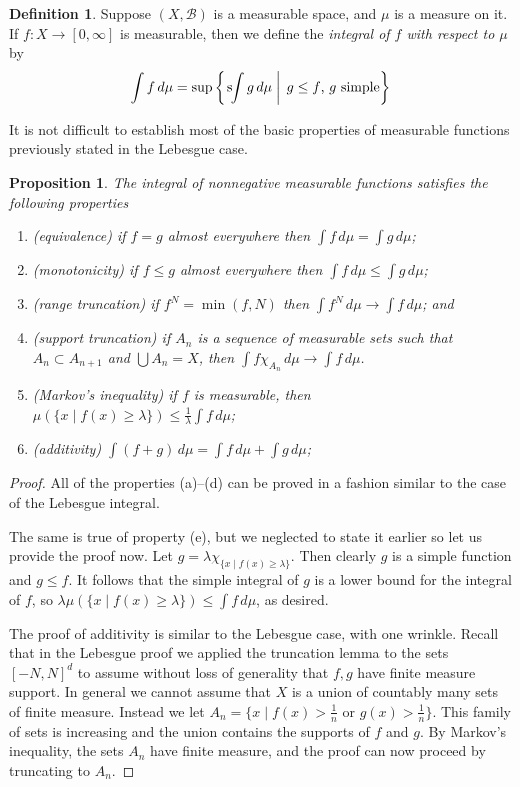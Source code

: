 \documentclass[11pt,oneside]{amsbook}
\newcommand{\sint}{\text{s}\kern-3pt\int}
\theoremstyle{definition}
\theoremstyle{plain}
\newtheorem{prop}[thm]{Proposition}
\theoremstyle{definition}
\newtheorem{defn}[thm]{Definition}
\theoremstyle{remark}
\numberwithin{equation}{section}
\numberwithin{figure}{section}
\begin{document}
\begin{defn}
  Suppose $(X,\mathcal B)$ is a measurable space, and $\mu$ is a measure on it. If $f\colon X\to[0,\infty]$ is measurable, then we define the \emph{integral of $f$ with respect to $\mu$} by
  \[\int f\,d\mu=\sup\left\{\left.\sint g\,d\mu\;\right|\;g\leq f\text{, $g$ simple}\right\}
  \]
\end{defn}

It is not difficult to establish most of the basic properties of measurable functions previously stated in the Lebesgue case.

\begin{prop}
  The integral of nonnegative measurable functions satisfies the following properties
  \begin{enumerate}
  \item (equivalence) if $f=g$ almost everywhere then $\int f\,d\mu=\int g\,d\mu$;
  \item (monotonicity) if $f\leq g$ almost everywhere then $\int f\,d\mu\leq\int g\,d\mu$;
  \item (range truncation) if $f^N=\min(f,N)$ then $\int f^N\,d\mu\to\int f\,d\mu$; and
  \item (support truncation) if $A_n$ is a sequence of measurable sets such that $A_n\subset A_{n+1}$ and $\bigcup A_n=X$, then $\int f\chi_{A_n}\,d\mu\to\int f\,d\mu$.
  \item (Markov's inequality) if $f$ is measurable, then $\mu(\{x\mid f(x)\geq\lambda\})\leq\frac1\lambda\int f\,d\mu$;
  \item (additivity) $\int(f+g)\,d\mu=\int f\,d\mu+\int g\,d\mu$;
  \end{enumerate}
\end{prop}

\begin{proof}
  All of the properties (a)--(d) can be proved in a fashion similar to the case of the Lebesgue integral.

  The same is true of property (e), but we neglected to state it earlier so let us provide the proof now. Let $g=\lambda\chi_{\{x\mid f(x)\geq\lambda\}}$. Then clearly $g$ is a simple function and $g\leq f$. It follows that the simple integral of $g$ is a lower bound for the integral of $f$, so $\lambda\mu(\{x\mid f(x)\geq\lambda\})\leq\int f\,d\mu$, as desired.

  The proof of additivity is similar to the Lebesgue case, with one wrinkle. Recall that in the Lebesgue proof we applied the truncation lemma to the sets $[-N,N]^d$ to assume without loss of generality that $f,g$ have finite measure support. In general we cannot assume that $X$ is a union of countably many sets of finite measure. Instead we let $A_n=\{x\mid f(x)>\frac1n\text{ or }g(x)>\frac1n\}$. This family of sets is increasing and the union contains the supports of $f$ and $g$. By Markov's inequality, the sets $A_n$ have finite measure, and the proof can now proceed by truncating to $A_n$.
\end{proof}
\end{document}
